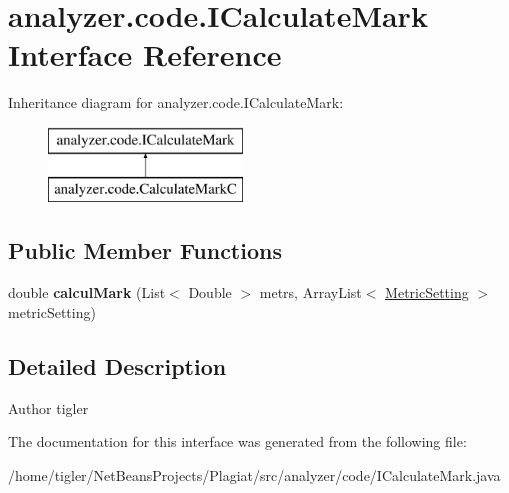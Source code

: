 \hypertarget{interfaceanalyzer_1_1code_1_1ICalculateMark}{}\section{analyzer.\+code.\+I\+Calculate\+Mark Interface Reference}
\label{interfaceanalyzer_1_1code_1_1ICalculateMark}
Inheritance diagram for analyzer.\+code.\+I\+Calculate\+Mark\+:\begin{figure}[H]
\begin{center}
\leavevmode
\includegraphics[height=2.000000cm]{interfaceanalyzer_1_1code_1_1ICalculateMark}
\end{center}
\end{figure}
\subsection*{Public Member Functions}
\begin{DoxyCompactItemize}
\item 
\mbox{\label{interfaceanalyzer_1_1code_1_1ICalculateMark_ad1e7a2d4fcffa56b451910cc521ce7f4}} 
double {\bfseries calcul\+Mark} (List$<$ Double $>$ metrs, Array\+List$<$ \hyperlink{classanalyzer_1_1code_1_1MetricSetting}{Metric\+Setting} $>$ metric\+Setting)
\end{DoxyCompactItemize}


\subsection{Detailed Description}
\begin{DoxyAuthor}{Author}
tigler 
\end{DoxyAuthor}


The documentation for this interface was generated from the following file\+:\begin{DoxyCompactItemize}
\item 
/home/tigler/\+Net\+Beans\+Projects/\+Plagiat/src/analyzer/code/I\+Calculate\+Mark.\+java\end{DoxyCompactItemize}
